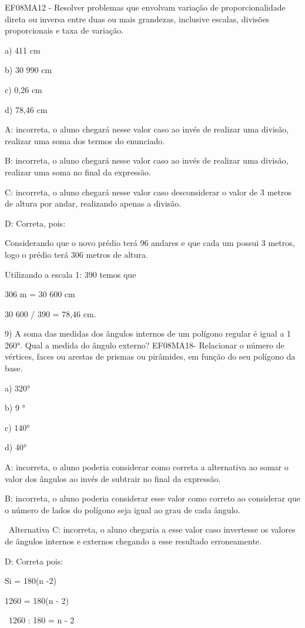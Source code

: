 EF08MA12 - Resolver problemas que envolvam variação de proporcionalidade
direta ou inversa entre duas ou mais grandezas, inclusive escalas,
divisões proporcionais e taxa de variação.

a) 411 cm

b) 30 990 cm

c) 0,26 cm

d) 78,46 cm

A: incorreta, o aluno chegará nesse valor caso ao invés de realizar uma
divisão, realizar uma soma dos termos do enunciado.

B: incorreta, o aluno chegará nesse valor caso ao invés de realizar uma
divisão, realizar uma soma no final da expressão.

C: incorreta, o aluno chegará nesse valor caso desconsiderar o valor de
3 metros de altura por andar, realizando apenas a divisão.

D: Correta, pois:

Considerando que o novo prédio terá 96 andares e que cada um possui 3
metros, logo o prédio terá 306 metros de altura.

Utilizando a escala 1: 390 temos que

306 m = 30 600 cm

30 600 / 390 = 78,46 cm.

9) A soma das medidas dos ângulos internos de um polígono regular é
igual a 1 260°. Qual a medida do ângulo externo? EF08MA18- Relacionar o
número de vértices, faces ou arestas de prismas ou pirâmides, em função
do seu polígono da base.

a) 320°

b) 9 °

c) 140°

d) 40°

A: incorreta, o aluno poderia considerar como correta a alternativa ao
somar o valor dos ângulos ao invés de subtrair no final da expressão.

B: incorreta, o aluno poderia considerar esse valor como correto ao
considerar que o número de lados do polígono seja igual ao grau de cada
ângulo.

~Alternativa C: incorreta, o aluno chegaria a esse valor caso invertesse
os valores de ângulos internos e externos chegando a esse resultado
erroneamente.

D: Correta pois:

Si = 180(n -2)

1260 = 180(n - 2)

~1260 : 180 = n - 2

